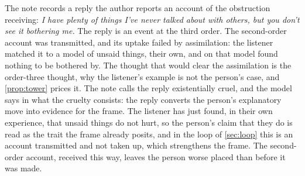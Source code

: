 The note records a reply the author reports an account of the obstruction receiving: \emph{I have plenty of things I've never talked about with others, but you don't see it bothering me.} The reply is an event at the third order. The second-order account was transmitted, and its uptake failed by assimilation: the listener matched it to a model of unsaid things, their own, and on that model found nothing to be bothered by. The thought that would clear the assimilation is the order-three thought, why the listener's example is not the person's case, and \autoref{prop:tower} prices it. The note calls the reply existentially cruel, and the model says in what the cruelty consists: the reply converts the person's explanatory move into evidence for the frame. The listener has just found, in their own experience, that unsaid things do not hurt, so the person's claim that they do is read as the trait the frame already posits, and in the loop of \autoref{sec:loop} this is an account transmitted and not taken up, which strengthens the frame. The second-order account, received this way, leaves the person worse placed than before it was made.

